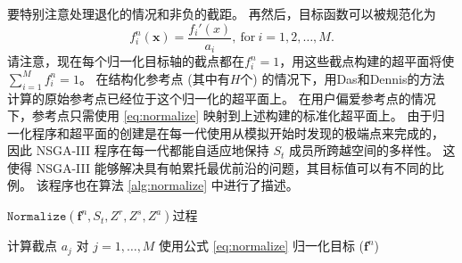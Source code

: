 要特别注意处理退化的情况和非负的截距。%
再然后，目标函数可以被规范化为
\begin{equation}\label{eq:normalize}
    f_i^n (\mathbf{x})= \frac{f_i'(x)}{a_i},\ \mathrm{for}\ i = 1, 2, \dots, M.
\end{equation}
请注意，现在每个归一化目标轴的截点都在$f_i^n = 1$，用这些截点构建的超平面将使$\sum^M_{i=1} f_i^n = 1$。
在结构化参考点 (其中有$H$个) 的情况下，用Das和Dennis\cite{das&dennis2000}的方法计算的原始参考点已经位于这个归一化的超平面上。%
在用户偏爱参考点的情况下，参考点只需使用 \ref{eq:normalize} 映射到上述构建的标准化超平面上。%
由于归一化程序和超平面的创建是在每一代使用从模拟开始时发现的极端点来完成的，%
因此 NSGA-III 程序在每一代都能自适应地保持 $S_t$ 成员所跨越空间的多样性。%
这使得 NSGA-III 能够解决具有帕累托最优前沿的问题，其目标值可以有不同的比例。%
该程序也在算法 \ref{alg:normalize} 中进行了描述。
\begin{algorithm}
    \caption{$\mathtt{Normalize}(\mathbf{f}^n, S_t, Z^r, Z^s, Z^a)$过程}\label{alg:normalize}


    计算截点 $a_j$ 对 $j = 1, \dots, M$
    使用公式 \ref{eq:normalize} 归一化目标 ($\mathbf{f}^n$)

\end{algorithm}
